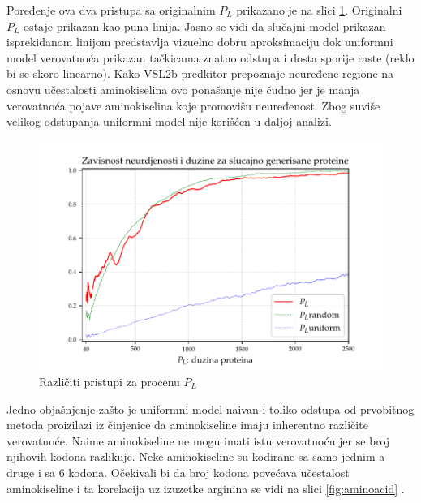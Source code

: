 Poređenje ova dva pristupa sa originalnim $P_L$ prikazano je na slici
\ref{fig:PL2}.  Originalni $P_L$ ostaje prikazan kao puna linija. Jasno se vidi
da slučajni model prikazan isprekidanom linijom predstavlja vizuelno dobru
aproksimaciju dok uniformni model verovatnoća prikazan tačkicama znatno odstupa
i dosta sporije raste (reklo bi se skoro linearno). Kako VSL2b predkitor
prepoznaje neuređene regione na osnovu učestalosti aminokiselina ovo ponašanje
nije čudno jer je manja verovatnoća pojave aminokiselina koje promovišu
neuređenost. Zbog suviše velikog odstupanja uniformni model nije korišćen u
daljoj analizi.


\begin{figure}[th]
\centering
\includegraphics[]{../plots/PL_F_cmp}
\decoRule
\caption{Različiti pristupi za procenu $P_L$}
\label{fig:PL2}
\end{figure}


Jedno objašnjenje zašto je uniformni model naivan i toliko odstupa od
prvobitnog metoda proizilazi iz činjenice da aminokiseline imaju inherentno
različite verovatnoće. Naime  aminokiseline ne mogu  imati istu
verovatnoću jer se  broj njihovih kodona razlikuje. Neke aminokiseline
su kodirane sa samo jednim a druge i sa 6 kodona. Očekivali bi da broj kodona
povećava učestalost aminokiseline i ta korelacija uz izuzetke arginina se vidi
na slici
\ref{fig:aminoacid} \parencite{AKfrekvencija}.

